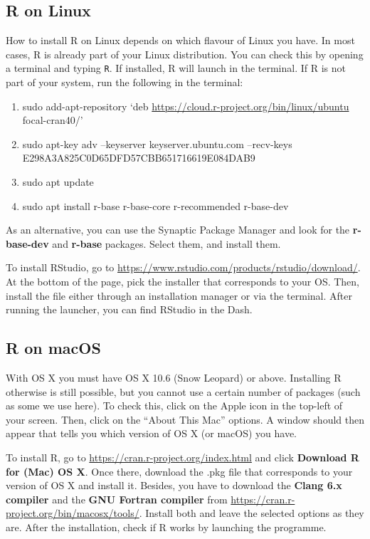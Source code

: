 \documentclass[
]{book}
\providecommand{\tightlist}{%
  \setlength{\itemsep}{0pt}\setlength{\parskip}{0pt}}
\begin{document}
\hypertarget{r-on-linux}{%
\subsection{R on Linux}\label{r-on-linux}}

How to install R on Linux depends on which flavour of Linux you have. In most cases, R is already part of your Linux distribution. You can check this by opening a terminal and typing \texttt{R}. If installed, R will launch in the terminal. If R is not part of your system, run the following in the terminal:

\begin{enumerate}
\def\labelenumi{\arabic{enumi}.}
\tightlist
\item
  sudo add-apt-repository `deb \url{https://cloud.r-project.org/bin/linux/ubuntu} focal-cran40/'
\item
  sudo apt-key adv --keyserver keyserver.ubuntu.com --recv-keys E298A3A825C0D65DFD57CBB651716619E084DAB9
\item
  sudo apt update
\item
  sudo apt install r-base r-base-core r-recommended r-base-dev
\end{enumerate}

As an alternative, you can use the Synaptic Package Manager and look for the \textbf{r-base-dev} and \textbf{r-base} packages. Select them, and install them.

To install RStudio, go to \url{https://www.rstudio.com/products/rstudio/download/}. At the bottom of the page, pick the installer that corresponds to your OS. Then, install the file either through an installation manager or via the terminal. After running the launcher, you can find RStudio in the Dash.

\hypertarget{r-on-macos}{%
\subsection{R on macOS}\label{r-on-macos}}

With OS X you must have OS X 10.6 (Snow Leopard) or above. Installing R otherwise is still possible, but you cannot use a certain number of packages (such as some we use here). To check this, click on the Apple icon in the top-left of your screen. Then, click on the ``About This Mac'' options. A window should then appear that tells you which version of OS X (or macOS) you have.

To install R, go to \url{https://cran.r-project.org/index.html} and click \textbf{Download R for (Mac) OS X}. Once there, download the .pkg file that corresponds to your version of OS X and install it. Besides, you have to download the \textbf{Clang 6.x compiler} and the \textbf{GNU Fortran compiler} from \url{https://cran.r-project.org/bin/macosx/tools/}. Install both and leave the selected options as they are. After the installation, check if R works by launching the programme.
\end{document}
